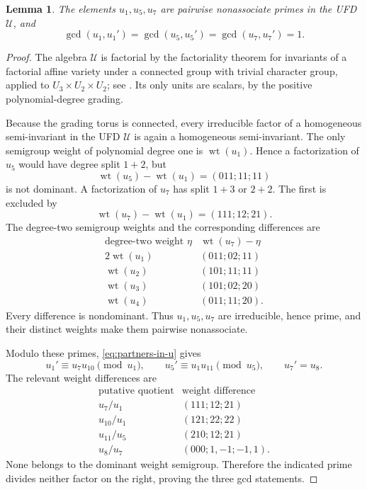 \documentclass[11pt,reqno]{amsart}
\numberwithin{equation}{section}
\newtheorem{lemma}[lemma]{Lemma}
\theoremstyle{remark}
\newcommand{\UR}{\mathscr U}
\newcommand{\wt}{\operatorname{wt}}
\begin{document}
\begin{lemma}
\label{lem:four-chart-coprimality}
The elements $u_1,u_5,u_7$ are pairwise nonassociate primes in the UFD
$\UR$, and
\[ \gcd(u_1,u_1')=\gcd(u_5,u_5')=\gcd(u_7,u_7')=1. \]
\end{lemma}

\begin{proof}
The algebra $\UR$ is factorial by the factoriality theorem for invariants
of a factorial affine variety under a connected group with trivial character
group, applied to $U_3\times U_2\times U_2$; see \cite{PV}.  Its only
units are scalars, by the positive polynomial-degree grading.

Because the grading torus is connected, every irreducible factor of a
homogeneous semi-invariant in the UFD $\UR$ is again a homogeneous
semi-invariant.  The only semigroup weight of polynomial degree one is
$\wt(u_1)$.  Hence a factorization of $u_5$ would have degree split
$1+2$, but
\[ \wt(u_5)-\wt(u_1)=(011;11;11) \]
is not dominant.  A factorization of $u_7$ has split $1+3$ or
$2+2$.  The first is excluded by
\[ \wt(u_7)-\wt(u_1)=(111;12;21). \]
The degree-two semigroup weights and the corresponding differences are
\[
\begin{array}{c|c}
\text{degree-two weight }\eta&\wt(u_7)-\eta\\ \hline
2\wt(u_1)&(011;02;11)\\
\wt(u_2)&(101;11;11)\\
\wt(u_3)&(101;02;20)\\
\wt(u_4)&(011;11;20).
\end{array}
\]
Every difference is nondominant.  Thus $u_1,u_5,u_7$ are irreducible,
hence prime, and their distinct weights make them pairwise nonassociate.

Modulo these primes, \eqref{eq:partners-in-u} gives
\[ u_1'\equiv u_7u_{10}\pmod{u_1},\qquad u_5'\equiv u_1u_{11}\pmod{u_5},\qquad u_7'=u_8. \]
The relevant weight differences are
\[
\begin{array}{c|c}
\text{putative quotient}&\text{weight difference}\\ \hline
u_7/u_1&(111;12;21)\\
u_{10}/u_1&(121;22;22)\\
u_{11}/u_5&(210;12;21)\\
u_8/u_7&(000;1,-1;-1,1).
\end{array}
\]
None belongs to the dominant weight semigroup.  Therefore the indicated
prime divides neither factor on the right, proving the three gcd statements.
\end{proof}
\end{document}
